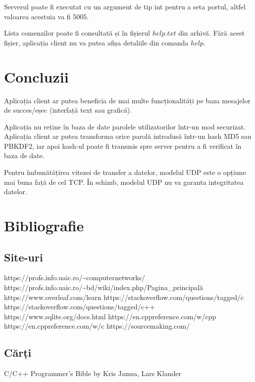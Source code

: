 \documentclass{article}
\begin{document}
Serverul poate fi executat cu un argument de tip int pentru a seta portul, altfel valoarea acestuia va fi 5005.

Lista comenzilor poate fi consultată și în fișierul $help.txt$ din arhivă. Fără acest fișier, aplicația client nu va putea afișa detaliile din comanda $help$.

\section{Concluzii}
\hspace{4mm} Aplicația client ar putea beneficia de mai multe funcționalități pe baza mesajelor de succes/eșec (interfață text sau grafică). 

Aplicația nu reține în baza de date parolele utilizatorilor într-un mod securizat. Aplicația client ar putea transforma orice parolă introdusă într-un hash MD5 sau PBKDF2, iar apoi hash-ul poate fi transmis spre server pentru a fi verificat în baza de date.

Pentru îmbunătățirea vitezei de transfer a datelor, modelul UDP este o opțiune mai buna față de cel TCP. În schimb, modelul UDP nu va garanta integritatea datelor.



\section{Bibliografie}
\subsection{Site-uri}
https://profs.info.uaic.ro/\textasciitilde computernetworks/
\linebreak
https://profs.info.uaic.ro/\textasciitilde bd/wiki/index.php/Pagina\_principală
\linebreak
https://www.overleaf.com/learn
\linebreak
https://stackoverflow.com/questions/tagged/c
\linebreak
https://stackoverflow.com/questions/tagged/c++
\linebreak
https://www.sqlite.org/docs.html
\linebreak
https://en.cppreference.com/w/cpp
\linebreak
https://en.cppreference.com/w/c
\linebreak
https://sourcemaking.com/
\linebreak

\subsection{Cărți}
C/C++ Programmer's Bible by Kris Jamsa, Lars Klander
\end{document}
